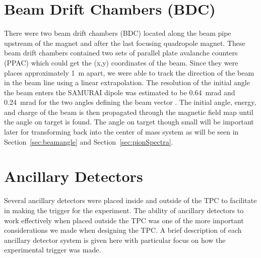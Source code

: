 
\section{Beam Drift Chambers (BDC)}
\label{sec:bdc}

There were two beam drift chambers (BDC) located along the beam pipe upstream of the magnet and after the last focusing quadropole magnet. These beam drift chambers contained two sets of parallel plate avalanche counters (PPAC) which could get the (x,y) coordinates of the beam. Since they were places approximately \SI{1}{\metre} apart, we were able to track the direction of the beam in the beam line using a linear extrapolation. The resolution of the initial angle the beam enters the SAMURAI dipole was estimated to be \SI{0.64}{\milli\radian} and \SI{0.24}{\milli\radian} for the two angles defining the beam vector \cite{jon}. The initial angle, energy, and charge of the beam is then propagated through the magnetic field map until the angle on target is found. The angle on target though small will be important later for transforming back into the center of mass system as will be seen in Section~\ref{sec:beamangle} and Section~\ref{sec:pionSpectra}.


\section{Ancillary Detectors }
Several ancillary detectors were placed inside and outside of the \spirit TPC to facilitate in making the trigger for the experiment. The ability of ancillary detectors to work effectively when placed outside the TPC  was one of the more important considerations we made when designing the TPC. A brief description of each ancillary detector system is given here with particular focus on how the experimental trigger was made. 



